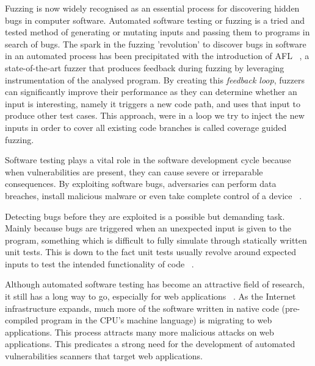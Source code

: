 Fuzzing is now widely recognised as an essential process for discovering hidden bugs in computer software. Automated software testing or fuzzing is a tried and tested method of generating or mutating inputs and passing them to programs in search of bugs. The spark in the fuzzing 'revolution' to discover bugs in software in an automated process has been precipitated with the introduction of AFL ~\cite{zalewski2015american}, a state-of-the-art fuzzer that produces feedback during fuzzing by leveraging instrumentation of the analysed program. By creating this \textit{feedback loop}, fuzzers can significantly improve their performance as they can determine whether an input is interesting, namely it triggers a new code path, and uses that input to produce other test cases. This approach, were in a loop we try to inject the new inputs in order to cover all existing code branches is called coverage guided fuzzing.

Software testing plays a vital role in the software development cycle because when vulnerabilities are present, they can cause severe or irreparable consequences. By exploiting software bugs, adversaries can perform data breaches, install malicious malware or even take complete control of a device ~\cite{hackerscontrol,facebook_data_breach}.

Detecting bugs before they are exploited is a possible but demanding task. Mainly because bugs are triggered when an unexpected input is given to the program, something which is difficult to fully simulate through statically written unit tests. This is down to the fact unit tests usually revolve around expected inputs to test the intended functionality of code ~\cite{aschermann2019nautilus}.

Although automated software testing has become an attractive field of research, it still has a long way to go, especially for web applications ~\cite{doupe2010johnny}. As the Internet infrastructure expands, much more of the software written in native code (pre-compiled program in the CPU's machine language) is migrating to web applications. This process attracts many more malicious attacks on web applications. This predicates a strong need for the development of automated vulnerabilities scanners that target web applications.
 
